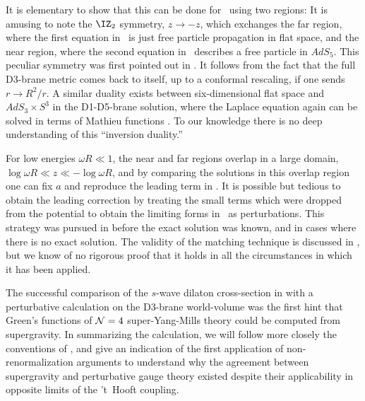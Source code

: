 It is elementary to show that this can be done for \LthPartial\ using two
regions:
 It is amusing to note the $\IZ_2$ symmetry, $z \to -z$, which exchanges
the far region, where the first equation in \MatchSoln\ is just free
particle propagation in flat space, and the near region, where the second
equation in \MatchSoln\ describes a free particle in $AdS_5$.  This
peculiar symmetry was first pointed out in \cite{Klebanov:1997kc}.  It
follows from the fact that the full D3-brane metric comes back to itself,
up to a conformal rescaling, if one sends $r \to R^2/r$.  A similar duality
exists between six-dimensional flat space and $AdS_3 \times S^3$ in the
D1-D5-brane solution, where the Laplace equation again can be solved in
terms of Mathieu functions \cite{ghUnp,Cvetic:1999fv}.  To our knowledge
there is no deep understanding of this ``inversion duality.''

 For low energies $\omega R \ll 1$, the near and far regions overlap in a
large domain, $\log \omega R \ll z \ll -\log \omega R$, and by comparing
the solutions in this overlap region one can fix $a$ and reproduce the
leading term in \LowCross.  It is possible but tedious to obtain the
leading correction by treating the small terms which were dropped from the
potential to obtain the limiting forms in \MatchSoln\ as perturbations.
This strategy was pursued in \cite{Gubser:1998kv,Taylor-Robinson:1998tk}
before the exact solution was known, and in cases where there is no exact
solution.  The validity of the matching technique is discussed in
\cite{Matzner}, but we know of no rigorous proof that it holds in all the
circumstances in which it has been applied.

The successful comparison of the $s$-wave dilaton cross-section in
\cite{Klebanov:1997kc} with a perturbative calculation on the D3-brane
world-volume was the first hint that Green's functions of ${\cal N}=4$
super-Yang-Mills theory could be computed from supergravity.  In
summarizing the calculation, we will follow more closely the conventions of
\cite{Gubser:1997yh}, and give an indication of the first application of
non-renormalization arguments \cite{Gubser:1997se} to understand why the
agreement between supergravity and perturbative gauge theory existed
despite their applicability in opposite limits of the 't~Hooft coupling.

